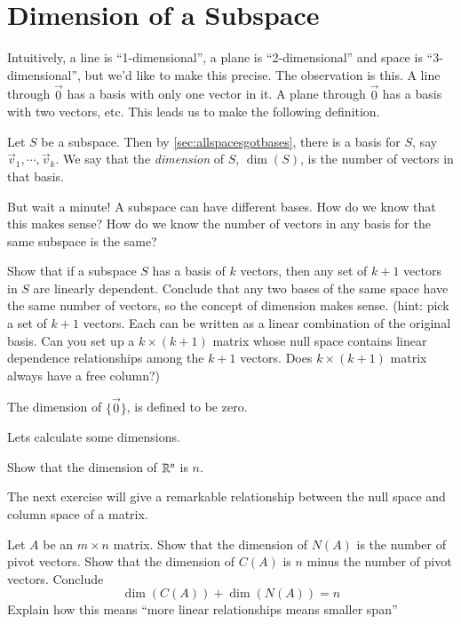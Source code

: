 \exersisesk

\section{Dimension of a Subspace}

Intuitively, a line is ``1-dimensional'', a plane is ``2-dimensional'' and space is ``3-dimensional'', but we'd like to make this precise.
The observation is this.  
A line through $\vec{0}$ has a basis with only one vector in it.  A plane through $\vec{0}$ has a basis with two vectors, etc.
This leads us to make the following definition.
\begin{Def}
  Let $S$ be a subspace.  
  Then by \ref{sec:allspacesgotbases}, there is a basis for $S$, say $\vec{v}_1,\cdots,\vec{v}_k$.
  We say that the \emph{dimension} of $S$, $\dim(S)$, is the number of vectors in that basis.
\end{Def}

But wait a minute!
A subspace can have different bases.
How do we know that this makes sense?
How do we know the number of vectors in any basis for the same subspace is the same?
\begin{TrickyEx}
  Show that if a subspace $S$ has a basis of $k$ vectors, then any set of $k+1$ vectors in $S$ are linearly dependent.
  Conclude that any two bases of the same space have the same number of vectors, so the concept of dimension makes sense.  
  (hint: pick a set of $k+1$ vectors.  Each can be written as a linear combination of the original basis.  Can you set up a $k\times (k+1)$ matrix whose null space contains linear dependence relationships among the $k+1$ vectors.
  Does $k\times (k+1)$ matrix always have a free column?)
\end{TrickyEx}

\begin{UnimportantRemark}
  The dimension of $\{\vec{0}\}$, is defined to be zero.
\end{UnimportantRemark}

Lets calculate some dimensions.
\begin{EasyEx}
  Show that the dimension of $\mathbb{R}^n$ is $n$.
\end{EasyEx}

The next exercise will give a remarkable relationship between the null space and column space of a matrix.

\begin{ImpEx}
  Let $A$ be an $m\times n$ matrix.  
  Show that the dimension of $N(A)$ is the number of pivot vectors.
  Show that the dimension of $C(A)$ is $n$ minus the number of pivot vectors.
  Conclude
  \[\dim(C(A)) + \dim(N(A)) = n\]
  Explain how this means ``more linear relationships means smaller span''
\end{ImpEx}


